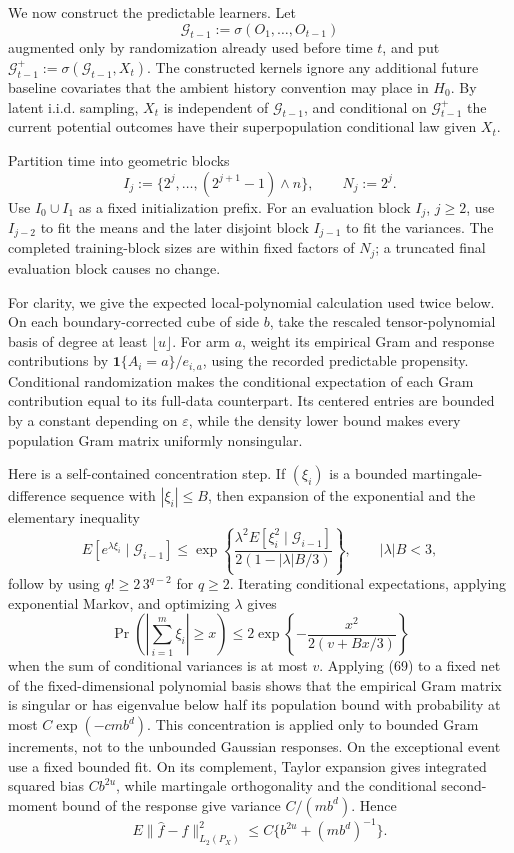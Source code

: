 We now construct the predictable learners. Let
\[
\mathcal G_{t-1}:=\sigma(O_1,\ldots,O_{t-1})
\]
augmented only by randomization already used before time \(t\), and put \(\mathcal G_{t-1}^{+}:=\sigma(\mathcal G_{t-1},X_t)\). The constructed kernels ignore any additional future baseline covariates that the ambient history convention may place in \(H_0\). By latent i.i.d. sampling, \(X_t\) is independent of \(\mathcal G_{t-1}\), and conditional on \(\mathcal G_{t-1}^{+}\) the current potential outcomes have their superpopulation conditional law given \(X_t\).

Partition time into geometric blocks
\[
I_j:=\{2^j,\ldots,(2^{j+1}-1)\wedge n\},
\qquad N_j:=2^j.
\tag{68}
\]
Use \(I_0\cup I_1\) as a fixed initialization prefix. For an evaluation block \(I_j\), \(j\geq2\), use \(I_{j-2}\) to fit the means and the later disjoint block \(I_{j-1}\) to fit the variances. The completed training-block sizes are within fixed factors of \(N_j\); a truncated final evaluation block causes no change.

For clarity, we give the expected local-polynomial calculation used twice below. On each boundary-corrected cube of side \(b\), take the rescaled tensor-polynomial basis of degree at least \(\lfloor u\rfloor\). For arm \(a\), weight its empirical Gram and response contributions by \(\mathbf1\{A_i=a\}/e_{i,a}\), using the recorded predictable propensity. Conditional randomization makes the conditional expectation of each Gram contribution equal to its full-data counterpart. Its centered entries are bounded by a constant depending on \(\varepsilon\), while the density lower bound makes every population Gram matrix uniformly nonsingular.

Here is a self-contained concentration step. If \((\xi_i)\) is a bounded martingale-difference sequence with \(|\xi_i|\leq B\), then expansion of the exponential and the elementary inequality
\[
E[e^{\lambda\xi_i}\mid\mathcal G_{i-1}]
\leq
\exp\!\left\{
\frac{\lambda^2E[\xi_i^2\mid\mathcal G_{i-1}]}
{2(1-|\lambda|B/3)}
\right\},
\qquad |\lambda|B<3,
\]
follow by using \(q!\geq2\,3^{q-2}\) for \(q\geq2\). Iterating conditional expectations, applying exponential Markov, and optimizing \(\lambda\) gives
\[
\Pr\!\left(\left|\sum_{i=1}^m\xi_i\right|\geq x\right)
\leq2\exp\!\left\{-\frac{x^2}{2(v+Bx/3)}\right\}
\tag{69}
\]
when the sum of conditional variances is at most \(v\). Applying (69) to a fixed net of the fixed-dimensional polynomial basis shows that the empirical Gram matrix is singular or has eigenvalue below half its population bound with probability at most \(C\exp(-cmb^d)\). This concentration is applied only to bounded Gram increments, not to the unbounded Gaussian responses. On the exceptional event use a fixed bounded fit. On its complement, Taylor expansion gives integrated squared bias \(Cb^{2u}\), while martingale orthogonality and the conditional second-moment bound of the response give variance \(C/(mb^d)\). Hence
\[
E\|\widehat f-f\|_{L_2(P_X)}^2
\leq C\{b^{2u}+(mb^d)^{-1}\}.
\tag{70}
\]

